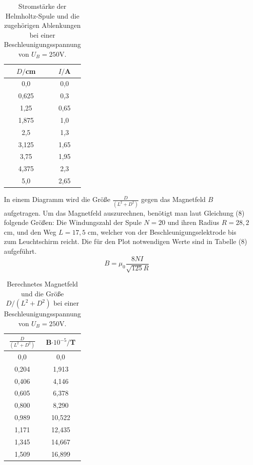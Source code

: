 \begin{table}[H]
  \centering
  \caption{Stromstärke der Helmholtz-Spule und die zugehörigen Ablenkungen bei einer Beschleunigungsspannung von $U_B = 250 \si{\volt}$.}
  \label{tab:Parameter}
  \begin{tabular}{c c}
    \toprule
    $D/$cm& $I/$A \\
    \bottomrule
    0,0 & 0,0 \\
     0,625 & 0,3  \\
     1,25 & 0,65 \\
     1,875 & 1,0  \\
     2,5 & 1,3 \\
     3,125 & 1,65  \\
     3,75& 1,95  \\
     4,375 & 2,3  \\
     5,0 &  2,65 \\
     \bottomrule
  \end{tabular}
\end{table}

\noindent In einem Diagramm wird die Größe $\frac{D}{(L^2+D^2)}$ gegen das Magnetfeld $B$ aufgetragen.
Um das Magnetfeld auszurechnen, benötigt man laut Gleichung (8) folgende Größen: Die Windungszahl der Spule $N=20$ und ihren Radius $R=28,2$\si{\cm}, und
den Weg $L=17,5$ \si{\cm}, welcher von der Beschleunigungselektrode bis zum Leuchtschirm reicht.
Die für den Plot notwendigen Werte sind in Tabelle (8) aufgeführt.
\begin{equation}
B = \mu_0 \frac{8NI}{\sqrt{125}R}
\end{equation}
  


\begin{table}[H]
  \centering
  \caption{Berechnetes Magnetfeld und die Größe $D/(L^2+D^2)$ bei einer Beschleunigungsspannung von $U_B = 250 \si{\volt}$.}
  \label{tab:Parameter}
  \begin{tabular}{c c}
    \toprule
    $\frac{D}{(L^2+D^2)}$& $ $B$ \cdot 10^{-5} /$T \\
    \bottomrule
     0,0 & 0,0 \\
     0,204 & 1,913  \\
     0,406 & 4,146 \\
     0,605 & 6,378 \\
     0,800 & 8,290 \\
     0,989 & 10,522  \\
     1,171 & 12,435  \\
     1,345 & 14,667 \\
     1,509 & 16,899 \\
     \bottomrule
  \end{tabular}
\end{table}


